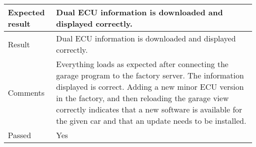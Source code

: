 \begin{table}[H]
\begin{tabularx}{1.0\textwidth}{
    |p{}     %
    |p{}|    %
}
Expected result
& Dual ECU information is downloaded and displayed correctly.
\\
\hline

Result
& Dual ECU information is downloaded and displayed correctly.
\\
\hline

Comments
& Everything loads as expected after connecting the garage program to the factory server. The information displayed is correct. Adding a new minor ECU version in the factory, and then reloading the garage view correctly indicates that a new software is available for the given car and that an update needs to be installed.
\\
\hline

Passed
& Yes
\\
\hline

\end{tabularx}
\end{table}



